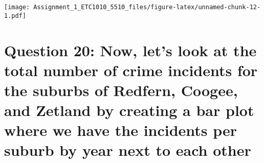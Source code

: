 \documentclass[
]{article}
\newenvironment{Shaded}{\begin{snugshade}}{\end{snugshade}}
\newcommand{\CommentTok}[1]{\textcolor[rgb]{0.56,0.35,0.01}{\textit{#1}}}
\newcommand{\DataTypeTok}[1]{\textcolor[rgb]{0.13,0.29,0.53}{#1}}
\newcommand{\KeywordTok}[1]{\textcolor[rgb]{0.13,0.29,0.53}{\textbf{#1}}}
\newcommand{\NormalTok}[1]{#1}
\newcommand{\OperatorTok}[1]{\textcolor[rgb]{0.81,0.36,0.00}{\textbf{#1}}}
\newcommand{\StringTok}[1]{\textcolor[rgb]{0.31,0.60,0.02}{#1}}
\begin{document}
\begin{Shaded}
\end{Shaded}

\texttt{[image: Assignment\_1\_ETC1010\_5510\_files/figure-latex/unnamed-chunk-12-1.pdf]}

\hypertarget{question-20-now-lets-look-at-the-total-number-of-crime-incidents-for-the-suburbs-of-redfern-coogee-and-zetland-by-creating-a-bar-plot-where-we-have-the-incidents-per-suburb-by-year-next-to-each-other}{%
\section{Question 20: Now, let's look at the total number of crime
incidents for the suburbs of Redfern, Coogee, and Zetland by creating a
bar plot where we have the incidents per suburb by year next to each
other}\label{question-20-now-lets-look-at-the-total-number-of-crime-incidents-for-the-suburbs-of-redfern-coogee-and-zetland-by-creating-a-bar-plot-where-we-have-the-incidents-per-suburb-by-year-next-to-each-other}}
\end{document}
